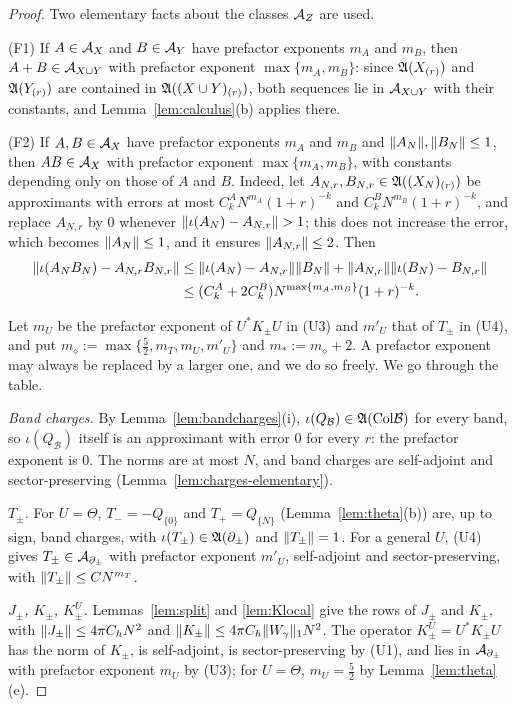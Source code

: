 \begin{proof}
Two elementary facts about the classes $\mathcal{A}_Z$ are used.

(F1) If $A\in\mathcal{A}_X$ and $B\in\mathcal{A}_Y$ have prefactor exponents $m_A$ and $m_B$, then $A+B\in\mathcal{A}_{X\cup Y}$ with prefactor
exponent $\max\{m_A,m_B\}$: since $\mathfrak{A}(X_{(r)})$ and $\mathfrak{A}(Y_{(r)})$ are contained in $\mathfrak{A}((X\cup Y)_{(r)})$, both
sequences lie in $\mathcal{A}_{X\cup Y}$ with their constants, and Lemma~\ref{lem:calculus}(b) applies there.

(F2) If $A,B\in\mathcal{A}_X$ have prefactor exponents $m_A$ and $m_B$ and $\lVert A_N\rVert,\lVert B_N\rVert\le1$, then $AB\in\mathcal{A}_X$ with
prefactor exponent $\max\{m_A,m_B\}$, with constants depending only on those of $A$ and $B$. Indeed, let
$A_{N,r},B_{N,r}\in\mathfrak{A}((X_N)_{(r)})$ be approximants with errors at most $C^A_kN^{m_A}(1+r)^{-k}$ and
$C^B_kN^{m_B}(1+r)^{-k}$, and replace $A_{N,r}$ by $0$ whenever $\lVert\iota(A_N)-A_{N,r}\rVert>1$; this does not increase the
error, which becomes $\lVert A_N\rVert\le1$, and it ensures $\lVert A_{N,r}\rVert\le2$. Then
\begin{align*}
\lVert\iota(A_NB_N)-A_{N,r}B_{N,r}\rVert&\le\lVert\iota(A_N)-A_{N,r}\rVert\lVert B_N\rVert+\lVert A_{N,r}\rVert\lVert\iota(B_N)-B_{N,r}\rVert\\
&\le(C^A_k+2C^B_k)N^{\max\{m_A,m_B\}}(1+r)^{-k}.
\end{align*}

Let $m_U$ be the prefactor exponent of $U^*K_\pm U$ in (U3) and $m'_U$ that of $T_\pm$ in (U4), and put
$m_\diamond:=\max\{\frac52,m_T,m_U,m'_U\}$ and $m_*:=m_\diamond+2$. A prefactor exponent may always be replaced by a larger one,
and we do so freely. We go through the table.

\emph{Band charges.} By Lemma~\ref{lem:bandcharges}(i), $\iota(Q_{\mathcal B})\in\mathfrak{A}(\mathrm{Col}\mathcal B)$ for every band, so
$\iota(Q_{\mathcal B})$ itself is an approximant with error $0$ for every $r$: the prefactor exponent is $0$. The norms
are at most $N$, and band charges are self-adjoint and sector-preserving (Lemma~\ref{lem:charges-elementary}).

\emph{$T_\pm$.} For $U=\Theta$, $T_-=-Q_{\{0\}}$ and $T_+=Q_{\{N\}}$ (Lemma~\ref{lem:theta}(b)) are, up to sign, band
charges, with $\iota(T_\pm)\in\mathfrak{A}(\partial_\pm)$ and $\lVert T_\pm\rVert=1$. For a general $U$, (U4) gives
$T_\pm\in\mathcal{A}_{\partial_\pm}$ with prefactor exponent $m'_U$, self-adjoint and sector-preserving, with
$\lVert T_\pm\rVert\le CN^{m_T}$.

\emph{$J_\pm$, $K_\pm$, $K^U_\pm$.} Lemmas~\ref{lem:split} and \ref{lem:Klocal} give the rows of $J_\pm$ and $K_\pm$, with
$\lVert J_\pm\rVert\le4\pi C_hN^2$ and $\lVert K_\pm\rVert\le4\pi C_h\lVert W_{\gamma}\rVert_1N^2$. The operator $K^U_\pm=U^*K_\pm U$ has the norm of
$K_\pm$, is self-adjoint, is sector-preserving by (U1), and lies in $\mathcal{A}_{\partial_\pm}$ with prefactor exponent $m_U$ by
(U3); for $U=\Theta$, $m_U=\frac52$ by Lemma~\ref{lem:theta}(e).


\end{proof}
